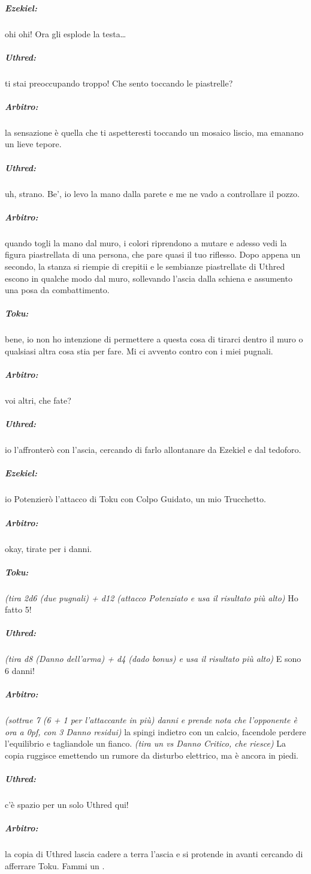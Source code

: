 \documentclass[itdr]{subfiles}
\begin{document}
{\subparagraph{Ezekiel:} ohi ohi! Ora gli esplode la testa\ldots

\subparagraph{Uthred:} ti stai preoccupando troppo! Che sento toccando le piastrelle?

\subparagraph{Arbitro:} la sensazione è quella che ti aspetteresti toccando un mosaico liscio, ma emanano un lieve tepore.

\subparagraph{Uthred:} uh, strano. Be', io levo la mano dalla parete e me ne vado a controllare il pozzo.

\subparagraph{Arbitro:} quando togli la mano dal muro, i colori riprendono a mutare e adesso vedi la figura piastrellata di una persona, che pare quasi il tuo riflesso. Dopo appena un secondo, la stanza si riempie di crepitii e le sembianze piastrellate di Uthred escono in qualche modo dal muro, sollevando l'ascia dalla schiena e assumento una posa da combattimento.

\subparagraph{Toku:} bene, io non ho intenzione di permettere a questa cosa di tirarci dentro il muro o qualsiasi altra cosa stia per fare. Mi ci avvento contro con i miei pugnali.

\subparagraph{Arbitro:} voi altri, che fate?

\subparagraph{Uthred:} io l'affronterò con l'ascia, cercando di farlo allontanare da Ezekiel e dal tedoforo.

\subparagraph{Ezekiel:} io Potenzierò l'attacco di Toku con Colpo Guidato, un mio Trucchetto.

\subparagraph{Arbitro:} okay, tirate per i danni.

\subparagraph{Toku:} {\em (tira 2d6 (due pugnali) + d12 (attacco Potenziato e usa il risultato più alto)} Ho fatto 5!

\subparagraph{Uthred:} {\em (tira d8 (Danno dell'arma) + d4 (dado bonus) e usa il risultato più alto)} E sono 6 danni!

\subparagraph{Arbitro:} {\em (sottrae 7 (6 + 1 per l'attaccante in più) danni e prende nota che l'opponente è ora a 0pf, con 3 Danno residui)} la spingi indietro con un calcio, facendole perdere l'equilibrio e tagliandole un fianco. {\em (tira un  vs Danno Critico, che riesce)} La copia ruggisce emettendo un rumore da disturbo elettrico, ma è ancora in piedi.

\subparagraph{Uthred:} c'è spazio per un solo Uthred qui!

\subparagraph{Arbitro:} la copia di Uthred lascia cadere a terra l'ascia e si protende in avanti cercando di afferrare Toku. Fammi un .

}
\end{document}
